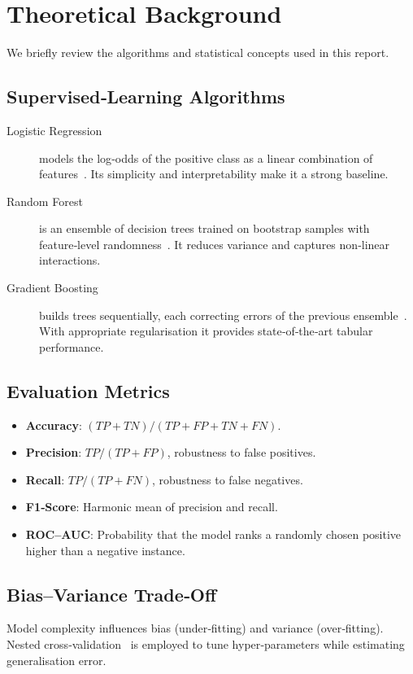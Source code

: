 \documentclass[12pt]{article}
\begin{document}
\section{Theoretical Background}
We briefly review the algorithms and statistical concepts used in this report.
\subsection{Supervised‐Learning Algorithms}
\begin{description}
  \item[Logistic Regression] models the log‑odds of the positive class as a linear combination of features \cite{hosmer2013}.  Its simplicity and interpretability make it a strong baseline.
  \item[Random Forest] is an ensemble of decision trees trained on bootstrap samples with feature‑level randomness \cite{breiman2001}.  It reduces variance and captures non‑linear interactions.
  \item[Gradient Boosting] builds trees sequentially, each correcting errors of the previous ensemble \cite{friedman2001}.  With appropriate regularisation it provides state‑of‑the‑art tabular performance.
\end{description}
\subsection{Evaluation Metrics}
\begin{itemize}
  \item \textbf{Accuracy}: $(TP+TN)/(TP+FP+TN+FN)$.
  \item \textbf{Precision}: $TP/(TP+FP)$, robustness to false positives.
  \item \textbf{Recall}: $TP/(TP+FN)$, robustness to false negatives.
  \item \textbf{F1‑Score}: Harmonic mean of precision and recall.
  \item \textbf{ROC–AUC}: Probability that the model ranks a randomly chosen positive higher than a negative instance.
\end{itemize}
\subsection{Bias–Variance Trade‑Off}
Model complexity influences bias (under‑fitting) and variance (over‑fitting).  Nested cross‑validation \cite{varma2006} is employed to tune hyper‑parameters while estimating generalisation error.
\end{document}
